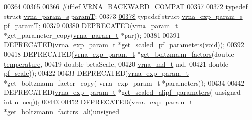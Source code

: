 \begin{DoxyCode}
00364 
00365 
00366 \textcolor{preprocessor}{#ifdef  VRNA\_BACKWARD\_COMPAT}
00367 
\hyperlink{group__energy__parameters_ga857dde86357d306cc902f0d8b2797659}{00372} \textcolor{keyword}{typedef} \textcolor{keyword}{struct }\hyperlink{group__energy__parameters_structvrna__param__s}{vrna\_param\_s} \hyperlink{group__energy__parameters_structvrna__param__s}{paramT};
00373 
\hyperlink{group__energy__parameters_ga8bffe1828e2cbec101769f5cc0b1535b}{00378} \textcolor{keyword}{typedef} \textcolor{keyword}{struct }\hyperlink{group__energy__parameters_structvrna__exp__param__s}{vrna\_exp\_param\_s} \hyperlink{group__energy__parameters_structvrna__exp__param__s}{pf\_paramT};
00379 
00380 DEPRECATED(\hyperlink{group__energy__parameters_structvrna__param__s}{vrna\_param\_t} *get\_parameter\_copy(\hyperlink{group__energy__parameters_structvrna__param__s}{vrna\_param\_t} *par));
00381 
00391 DEPRECATED(\hyperlink{group__energy__parameters_structvrna__exp__param__s}{vrna\_exp\_param\_t} *\hyperlink{group__energy__parameters_gabf3b9271c41dd3fac02d56e0b02b3344}{get\_scaled\_pf\_parameters}(\textcolor{keywordtype}{void}));
00392 
00418 DEPRECATED(\hyperlink{group__energy__parameters_structvrna__exp__param__s}{vrna\_exp\_param\_t} *\hyperlink{group__energy__parameters_gaef2b931c7e9d4ffb0a5c33df50ec2068}{get\_boltzmann\_factors}(\textcolor{keywordtype}{double}     
      \hyperlink{group__energy__parameters_aeed2cd83713012bcb52e431041e037c8}{temperature},
00419                                                    \textcolor{keywordtype}{double}     betaScale,
00420                                                    \hyperlink{group__model__details_structvrna__md__s}{vrna\_md\_t}  md,
00421                                                    \textcolor{keywordtype}{double}     \hyperlink{group__model__details_gad3b22044065acc6dee0af68931b52cfd}{pf\_scale}));
00422 
00433 DEPRECATED(\hyperlink{group__energy__parameters_structvrna__exp__param__s}{vrna\_exp\_param\_t} *\hyperlink{group__energy__parameters_ga665a446ba8ff211e551297a8fa36ec27}{get\_boltzmann\_factor\_copy}(
      \hyperlink{group__energy__parameters_structvrna__exp__param__s}{vrna\_exp\_param\_t} *parameters));
00434 
00442 DEPRECATED(\hyperlink{group__energy__parameters_structvrna__exp__param__s}{vrna\_exp\_param\_t} *\hyperlink{group__energy__parameters_ga0ccf4e1be085a573533fd6b9da2d8cf9}{get\_scaled\_alipf\_parameters}(\textcolor{keywordtype}{
      unsigned} \textcolor{keywordtype}{int} n\_seq));
00443 
00452 DEPRECATED(\hyperlink{group__energy__parameters_structvrna__exp__param__s}{vrna\_exp\_param\_t} *\hyperlink{group__energy__parameters_ga2aa1d87c97f35d2e4121634a17556829}{get\_boltzmann\_factors\_ali}(\textcolor{keywordtype}{unsigned} \textcolor{keywordtype}{
}
\end{DoxyCode}
